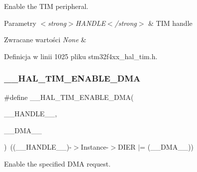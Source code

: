Enable the T\+IM peripheral. 


\begin{DoxyParams}{Parametry}
{\em $<$strong$>$\+H\+A\+N\+D\+L\+E$<$/strong$>$} & T\+IM handle \\
\hline
\end{DoxyParams}

\begin{DoxyRetVals}{Zwracane wartości}
{\em None} & \\
\hline
\end{DoxyRetVals}


Definicja w linii 1025 pliku stm32f4xx\+\_\+hal\+\_\+tim.\+h.

\mbox{\label{group___t_i_m___exported___macros_gabb91ccd46cd7204c87170a1ea5b38135}} 
\subsubsection{\texorpdfstring{\+\_\+\+\_\+\+H\+A\+L\+\_\+\+T\+I\+M\+\_\+\+E\+N\+A\+B\+L\+E\+\_\+\+D\+MA}{\_\_HAL\_TIM\_ENABLE\_DMA}}
{\footnotesize\ttfamily \#define \+\_\+\+\_\+\+H\+A\+L\+\_\+\+T\+I\+M\+\_\+\+E\+N\+A\+B\+L\+E\+\_\+\+D\+MA(\begin{DoxyParamCaption}\item[{}]{\+\_\+\+\_\+\+H\+A\+N\+D\+L\+E\+\_\+\+\_\+,  }\item[{}]{\+\_\+\+\_\+\+D\+M\+A\+\_\+\+\_\+ }\end{DoxyParamCaption})~((\+\_\+\+\_\+\+H\+A\+N\+D\+L\+E\+\_\+\+\_\+)-\/$>$Instance-\/$>$D\+I\+ER $\vert$= (\+\_\+\+\_\+\+D\+M\+A\+\_\+\+\_\+))}



Enable the specified D\+MA request. 


